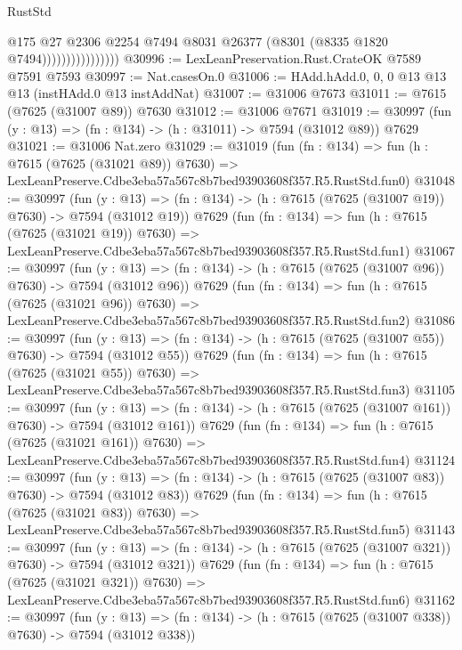 \begin{lexlean}{RustStd}
\begin{coremodule}
                                @175
                                @27
                                @2306
                                @2254
                                @7494
                                @8031
                                @26377
                                (@8301 (@8335 @1820 @7494))))))))))))))))
@30996 := LexLeanPreservation.Rust.CrateOK @7589 @7591 @7593
@30997 := Nat.casesOn.{0}
@31006 := HAdd.hAdd.{0, 0, 0} @13 @13 @13 (instHAdd.{0} @13 instAddNat)
@31007 := @31006 @7673
@31011 := @7615 (@7625 (@31007 @89)) @7630
@31012 := @31006 @7671
@31019 := @30997 (fun (y : @13) => (fn : @134) -> (h : @31011) -> @7594 (@31012 @89)) @7629
@31021 := @31006 Nat.zero
@31029 := @31019
    (fun (fn : @134) =>
    fun (h : @7615 (@7625 (@31021 @89)) @7630) =>
    LexLeanPreserve.Cdbe3eba57a567c8b7bed93903608f357.R5.RustStd.fun0)
@31048 := @30997
    (fun (y : @13) => (fn : @134) -> (h : @7615 (@7625 (@31007 @19)) @7630) -> @7594 (@31012 @19))
    @7629
    (fun (fn : @134) =>
    fun (h : @7615 (@7625 (@31021 @19)) @7630) =>
    LexLeanPreserve.Cdbe3eba57a567c8b7bed93903608f357.R5.RustStd.fun1)
@31067 := @30997
    (fun (y : @13) => (fn : @134) -> (h : @7615 (@7625 (@31007 @96)) @7630) -> @7594 (@31012 @96))
    @7629
    (fun (fn : @134) =>
    fun (h : @7615 (@7625 (@31021 @96)) @7630) =>
    LexLeanPreserve.Cdbe3eba57a567c8b7bed93903608f357.R5.RustStd.fun2)
@31086 := @30997
    (fun (y : @13) => (fn : @134) -> (h : @7615 (@7625 (@31007 @55)) @7630) -> @7594 (@31012 @55))
    @7629
    (fun (fn : @134) =>
    fun (h : @7615 (@7625 (@31021 @55)) @7630) =>
    LexLeanPreserve.Cdbe3eba57a567c8b7bed93903608f357.R5.RustStd.fun3)
@31105 := @30997
    (fun (y : @13) => (fn : @134) -> (h : @7615 (@7625 (@31007 @161)) @7630) -> @7594 (@31012 @161))
    @7629
    (fun (fn : @134) =>
    fun (h : @7615 (@7625 (@31021 @161)) @7630) =>
    LexLeanPreserve.Cdbe3eba57a567c8b7bed93903608f357.R5.RustStd.fun4)
@31124 := @30997
    (fun (y : @13) => (fn : @134) -> (h : @7615 (@7625 (@31007 @83)) @7630) -> @7594 (@31012 @83))
    @7629
    (fun (fn : @134) =>
    fun (h : @7615 (@7625 (@31021 @83)) @7630) =>
    LexLeanPreserve.Cdbe3eba57a567c8b7bed93903608f357.R5.RustStd.fun5)
@31143 := @30997
    (fun (y : @13) => (fn : @134) -> (h : @7615 (@7625 (@31007 @321)) @7630) -> @7594 (@31012 @321))
    @7629
    (fun (fn : @134) =>
    fun (h : @7615 (@7625 (@31021 @321)) @7630) =>
    LexLeanPreserve.Cdbe3eba57a567c8b7bed93903608f357.R5.RustStd.fun6)
@31162 := @30997
    (fun (y : @13) => (fn : @134) -> (h : @7615 (@7625 (@31007 @338)) @7630) -> @7594 (@31012 @338))

\end{coremodule}
\end{lexlean}
